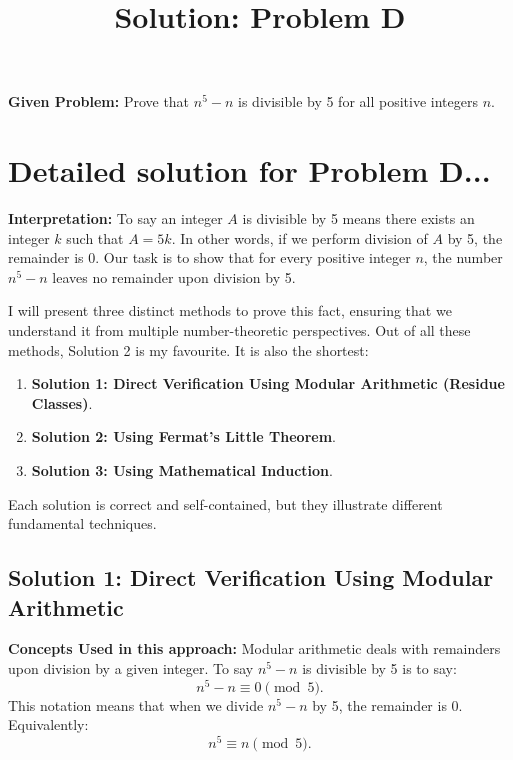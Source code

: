 \documentclass[12pt,a4paper]{article}
\begin{document}
\title{Solution: Problem D}
\date{}
\maketitle
\thispagestyle{fancy}



\noindent\textbf{Given Problem:} Prove that $n^5 - n$ is divisible by 5 for all positive integers $n$.

\medskip

\section*{Detailed solution for Problem D...}

\noindent\textbf{Interpretation:} To say an integer $A$ is divisible by 5 means there exists an integer $k$ such that $A = 5k$. In other words, if we perform division of $A$ by 5, the remainder is 0. Our task is to show that for every positive integer $n$, the number $n^5 - n$ leaves no remainder upon division by 5.

\medskip

I will present three distinct methods to prove this fact, ensuring that we understand it from multiple number-theoretic perspectives. Out of all these methods, Solution 2 is my favourite. It is also the shortest:

\medskip

\begin{enumerate}
   \item \textbf{Solution 1: Direct Verification Using Modular Arithmetic (Residue Classes)}.
   \item \textbf{Solution 2: Using Fermat's Little Theorem}.
   \item \textbf{Solution 3: Using Mathematical Induction}.
\end{enumerate}

Each solution is correct and self-contained, but they illustrate different fundamental techniques.

\medskip

\subsection*{Solution 1: Direct Verification Using Modular Arithmetic}

\noindent\textbf{Concepts Used in this approach:}  
Modular arithmetic deals with remainders upon division by a given integer. To say $n^5 - n$ is divisible by 5 is to say:
\[
n^5 - n \equiv 0 \pmod{5}.
\]
This notation means that when we divide $n^5-n$ by 5, the remainder is 0. Equivalently:
\[
n^5 \equiv n \pmod{5}.
\]
\end{document}
